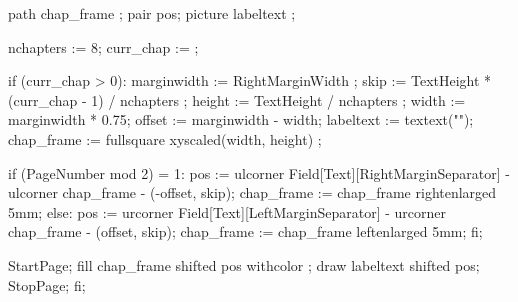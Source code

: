     path chap_frame ;
    pair pos;  
    picture labeltext ;
  
    nchapters := 8;
    curr_chap :=  ; 
  
    if (curr_chap > 0):
           marginwidth := RightMarginWidth ;
           skip   := TextHeight * (curr_chap - 1) / nchapters ;
           height := TextHeight / nchapters ;
           width  := marginwidth * 0.75;
           offset := marginwidth - width;
           labeltext := textext("\ssbfd \thumbindexfontcolor \getmarking[chapternumber]");
           chap_frame := fullsquare xyscaled(width, height) ;

           if (PageNumber mod 2) = 1:
               pos := ulcorner Field[Text][RightMarginSeparator] -
                      ulcorner chap_frame - (-offset, skip);
               chap_frame := chap_frame rightenlarged 5mm;
           else:
               pos := urcorner Field[Text][LeftMarginSeparator] -
                      urcorner chap_frame - (offset, skip);
               chap_frame := chap_frame leftenlarged 5mm;
           fi;

            StartPage;
                fill chap_frame shifted pos withcolor ;
                draw labeltext shifted pos;
            StopPage;
    fi;
\stopuseMPgraphic
